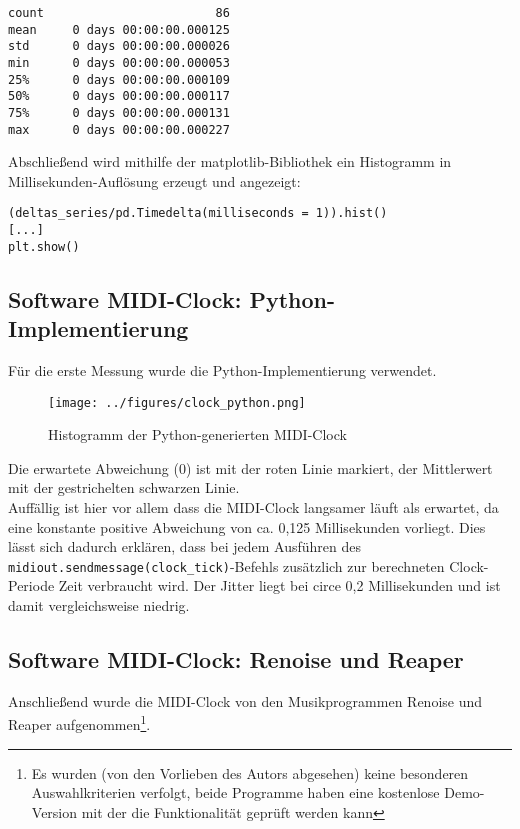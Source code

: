 \begin{verbatim}
count                        86
mean     0 days 00:00:00.000125
std      0 days 00:00:00.000026
min      0 days 00:00:00.000053
25%      0 days 00:00:00.000109
50%      0 days 00:00:00.000117
75%      0 days 00:00:00.000131
max      0 days 00:00:00.000227

\end{verbatim}

Abschließend wird mithilfe der matplotlib-Bibliothek ein Histogramm in Millisekunden-Auflösung erzeugt und angezeigt:

\begin{verbatim}
(deltas_series/pd.Timedelta(milliseconds = 1)).hist()
[...]
plt.show()
\end{verbatim}

\subsection{Software MIDI-Clock: Python-Implementierung}
Für die erste Messung wurde die Python-Implementierung verwendet.\
\begin{figure}[H]
	\centering
	\captionsetup{justification=centering,margin=2cm}
		\texttt{[image: ../figures/clock\_python.png]}
		\caption[Histogramm der Python-generierten MIDI-Clock]{Histogramm der Python-generierten MIDI-Clock}
	\label{fig:ice40_pmod_pins}
\end{figure}
Die erwartete Abweichung (0) ist mit der roten Linie markiert, der Mittlerwert mit der gestrichelten schwarzen Linie.\\
Auffällig ist hier vor allem dass die MIDI-Clock langsamer läuft als erwartet, da eine konstante positive Abweichung von ca. 0,125 Millisekunden vorliegt. Dies lässt sich dadurch erklären, dass bei jedem Ausführen des {\tt midiout.sendmessage(clock\_tick)}-Befehls zusätzlich zur berechneten Clock-Periode Zeit verbraucht wird. Der Jitter liegt bei circe 0,2 Millisekunden und ist damit vergleichsweise niedrig.


\subsection{Software MIDI-Clock: Renoise und Reaper}

Anschließend wurde die MIDI-Clock von den Musikprogrammen Renoise und Reaper aufgenommen\footnote{Es wurden (von den Vorlieben des Autors abgesehen) keine besonderen Auswahlkriterien verfolgt, beide Programme haben eine kostenlose Demo-Version mit der die Funktionalität geprüft werden kann}.

